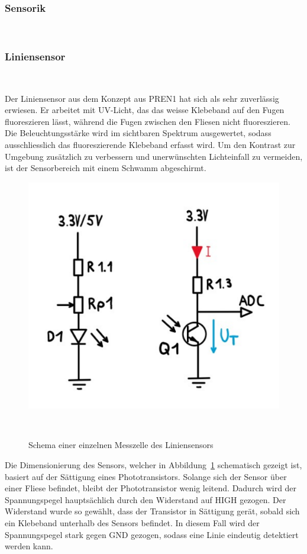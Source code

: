 \documentclass[main.tex]{subfiles} %
\begin{document}

\subsubsection{Sensorik}~\label{sec:Sensorik}

\subsubsection*{Liniensensor}~\label{sec:Sensorik_Liniensensor}

Der Liniensensor aus dem Konzept aus PREN1 hat sich als sehr zuverlässig
erwiesen. Er arbeitet mit UV-Licht, das das weisse Klebeband auf den Fugen
fluoreszieren lässt, während die Fugen zwischen den Fliesen nicht
fluoreszieren. Die Beleuchtungsstärke wird im sichtbaren Spektrum ausgewertet,
sodass ausschliesslich das fluoreszierende Klebeband erfasst wird. Um den
Kontrast zur Umgebung zusätzlich zu verbessern und unerwünschten Lichteinfall
zu vermeiden, ist der Sensorbereich mit einem Schwamm abgeschirmt.

\begin{figure}[H]
  \centering
  \includegraphics[width =
  0.5\linewidth]{./fig_Antriebsregelung_Firmware/Schema_Messzelle_Liniensensor.pdf}
  \caption{Schema einer einzelnen Messzelle des
  Liniensensors}~\label{fig:Schema_Messtelle_Liniensensor}
\end{figure}

Die Dimensionierung des Sensors, welcher in
Abbildung~\ref{fig:Schema_Messtelle_Liniensensor} schematisch gezeigt ist,
basiert auf der Sättigung eines Phototransistors. Solange sich der Sensor über
einer Fliese befindet, bleibt der Phototransistor wenig leitend. Dadurch wird
der Spannungspegel hauptsächlich durch den Widerstand auf HIGH gezogen. Der
Widerstand wurde so gewählt, dass der Transistor in Sättigung gerät, sobald
sich ein Klebeband unterhalb des Sensors befindet. In diesem Fall wird der
Spannungspegel stark gegen GND gezogen, sodass eine Linie eindeutig detektiert
werden kann.
\end{document}
